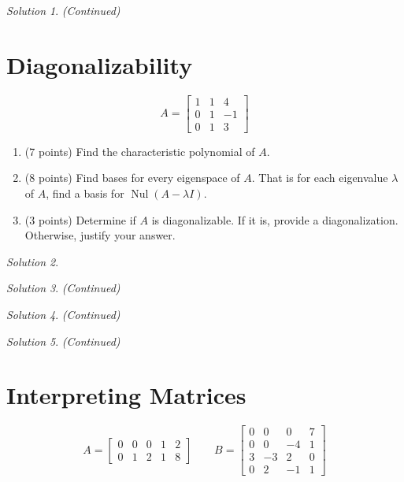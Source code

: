 \documentclass{article}
\theoremstyle{remark} \newtheorem*{solution}{Solution}
\DeclareMathOperator{\nul}{Nul} \DeclareMathOperator{\rank}{rank}
\begin{document}
\pagebreak
\begin{solution}
  \textit{(Continued)}
\end{solution}

\pagebreak
\section{Diagonalizability}

\begin{displaymath}
  A =
  \begin{bmatrix}
    1 & 1 & 4 \\ 0 & 1 & -1 \\ 0 & 1 & 3
  \end{bmatrix}
\end{displaymath}

\begin{enumerate}
\item (7 points) Find the characteristic polynomial of $A$.
\item (8 points) Find bases for every eigenspace of $A$. That is for
  each eigenvalue $\lambda$ of $A$, find a basis for $\nul(A - \lambda
  I)$.
\item (3 points) Determine if $A$ is diagonalizable. If it is, provide
  a diagonalization. Otherwise, justify your answer.
\end{enumerate}

\medskip

\begin{solution}
\end{solution}

\pagebreak
\begin{solution}
  \textit{(Continued)}
\end{solution}

\pagebreak
\begin{solution}
  \textit{(Continued)}
\end{solution}

\pagebreak
\begin{solution}
  \textit{(Continued)}
\end{solution}

\pagebreak
\section{Interpreting Matrices}

\begin{displaymath}
  A =
  \begin{bmatrix}
    0 & 0 & 0 & 1 & 2 \\ 0 & 1 & 2 & 1 & 8
  \end{bmatrix}
  \qquad B =
  \begin{bmatrix}
    0 & 0 & 0 & 7 \\ 0 & 0 & -4 & 1 \\ 3 & -3 & 2 & 0 \\ 0 & 2 & -1 &
    1
  \end{bmatrix}
\end{displaymath}
\end{document}
